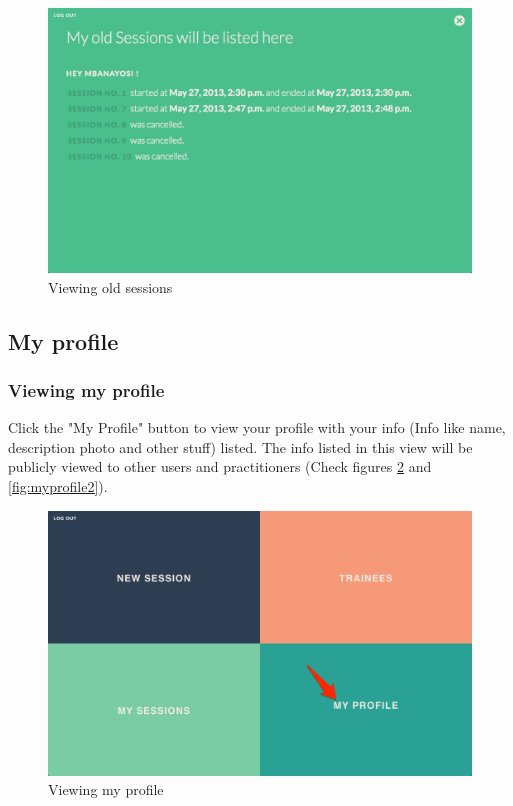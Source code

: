 \begin{figure}[htbp]
\centering 
\includegraphics[width=1.0\linewidth]{steps/MySessions2} 
\caption{Viewing old sessions} 
\label{fig:oldsession2} 
\end{figure} 

\subsection{My profile}

\subsubsection{Viewing my profile}\label{sec:viewprofile}
Click the "My Profile" button to view your profile with your info (Info like name, description photo and other stuff) listed. The info listed in this view will be publicly viewed to other users and practitioners (Check figures \ref{fig:myprofile} and \ref{fig:myprofile2}).

\begin{figure}[htbp]
\centering 
\includegraphics[width=1.0\linewidth]{steps/MyProfile} 
\caption{Viewing my profile} 
\label{fig:myprofile} 
\end{figure} 

